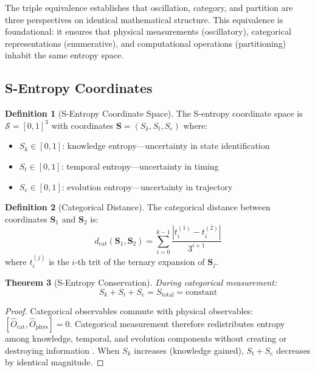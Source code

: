 \documentclass[10pt,twocolumn]{article}
\newtheorem{theorem}{Theorem}[section]
\theoremstyle{definition}
\newtheorem{definition}[theorem]{Definition}
\theoremstyle{remark}
\newcommand{\Sk}{S_k}
\newcommand{\St}{S_t}
\newcommand{\Se}{S_e}
\newcommand{\Scoord}{\mathbf{S}}
\newcommand{\Sspace}{\mathcal{S}}
\newcommand{\dcat}{d_{\mathrm{cat}}}
\newcommand{\Sk}{\mathscr{S}_k}
\newcommand{\Se}{\mathscr{S}_e}
\begin{document}
The triple equivalence establishes that oscillation, category, and partition are three perspectives on identical mathematical structure. This equivalence is foundational: it ensures that physical measurements (oscillatory), categorical representations (enumerative), and computational operations (partitioning) inhabit the same entropy space.

\subsection{S-Entropy Coordinates}

\begin{definition}[S-Entropy Coordinate Space]
\label{def:s_entropy}
The S-entropy coordinate space is $\Sspace = [0,1]^3$ with coordinates $\Scoord = (\Sk, \St, \Se)$ where:
\begin{itemize}[nosep]
\item $\Sk \in [0,1]$: knowledge entropy---uncertainty in state identification
\item $\St \in [0,1]$: temporal entropy---uncertainty in timing
\item $\Se \in [0,1]$: evolution entropy---uncertainty in trajectory
\end{itemize}
\end{definition}

\begin{definition}[Categorical Distance]
\label{def:cat_distance}
The categorical distance between coordinates $\Scoord_1$ and $\Scoord_2$ is:
\begin{equation}
\dcat(\Scoord_1, \Scoord_2) = \sum_{i=0}^{k-1} \frac{|t_i^{(1)} - t_i^{(2)}|}{3^{i+1}}
\end{equation}
where $t_i^{(j)}$ is the $i$-th trit of the ternary expansion of $\Scoord_j$.
\end{definition}

\begin{theorem}[S-Entropy Conservation]
\label{thm:conservation}
During categorical measurement:
\begin{equation}
\Sk + \St + \Se = S_{\text{total}} = \text{constant}
\end{equation}
\end{theorem}

\begin{proof}
Categorical observables commute with physical observables: $[\hat{O}_{\text{cat}}, \hat{O}_{\text{phys}}] = 0$. Categorical measurement therefore redistributes entropy among knowledge, temporal, and evolution components without creating or destroying information \cite{jaynes1957,cover2006}. When $\Sk$ increases (knowledge gained), $\St + \Se$ decreases by identical magnitude.
\end{proof}
\end{document}
